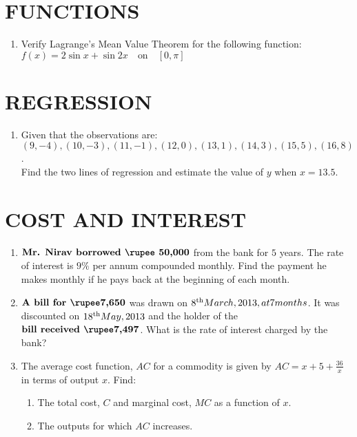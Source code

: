 \documentclass[12pt]{article}
\begin{document}
						\section{FUNCTIONS}
						\begin{enumerate}
							\item  Verify Lagrange's Mean Value Theorem for the following function:\\
								$f(x) = 2\sin x + \sin 2x \quad \text{on} \quad [0, \pi]$
				\end{enumerate}
				\section{REGRESSION}
				\begin{enumerate}
					\item Given that the observations are:
						\\                                $(9, -4), (10, -3), (11, -1), (12, 0), (13, 1), (14, 3), (15, 5), (16, 8)$. \\ 
						Find the two lines of regression and estimate the value of $y$ when $x = 13.5$.
				\end{enumerate}
				\section{COST AND INTEREST}
				\begin{enumerate}
					\item $\textbf{Mr. Nirav borrowed {\rupee 50,000}}$ from the bank for $5$ years. The rate of interest is $9\%$ per annum compounded monthly. Find the payment he makes monthly if he pays back at the beginning of each month.

					\item $\textbf{A bill for {\rupee7,650}}$ was drawn on $8\textsuperscript{th} March, 2013, at 7 months$. It was discounted on $18\textsuperscript{th} May, 2013$ and the holder of the $\textbf{bill received {\rupee7,497}}$. What is the rate of interest charged by the bank?
					
					\item The average cost function, $AC$ for a commodity is given by $AC = x + 5 + \frac{36}{x}$ in terms of output $x$. Find: \begin{enumerate}
							[label=\roman*] 
						\item The total cost, $C$ and marginal cost, $MC$ as a function of $x$. 
						\item The outputs for which $AC$ increases. 
				\end{enumerate}
				\end{enumerate}
\end{document}
